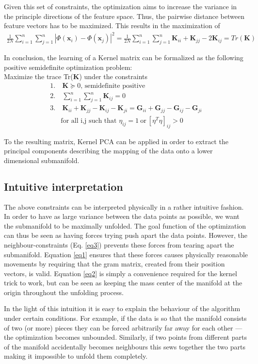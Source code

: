 \documentclass[a4paper,12pt]{article}
\newcommand{\mx}{\mathbf{x}}
\newcommand{\mG}{\mathbf{G}}
\newcommand{\mK}{\mathbf{K}}
\newcommand{\K}{\textbf{K}}
\begin{document}
Given this set of constraints, the optimization aims to increase the variance in the principle directions of the feature space. Thus, the pairwise distance between feature vectors has to be maximized. This results in the maximization of 
\begin{align}
\frac{1}{2N}\sum_{i = 1}^n\sum_{j = 1}^n |\Phi(\mx_i) - \Phi(\mx_j)|^2 =  \frac{1}{2N}\sum_{i = 1}^n\sum_{j = 1}^n \mK_{ii} + \mK_{jj} - 2 \mK_{ij} = Tr(\mK)
\end{align}

In conclusion, the learning of a Kernel matrix can be formalized as the following positive semidefinite optimization problem:\\
Maximize the trace Tr(\K) under the constraints
\begin{align}
\label{eq1}1.& \ \mK\succeq 0 \text{, semidefinite positive}\\
\label{eq2}2.& \ \sum_{i = 1}^n\sum_{j = 1}^n \mK_{ij} = 0\\
\label{eq3}3.&  \ \mK_{ii} + \mK_{jj} - \mK_{ij} - \mK_{ji}  = \mG_{ii} + \mG_{jj} - \mG_{ij} - \mG_{ji}\\
& \text{for all i,j such that } \eta_{ij} = 1 \ \text{or}\ [\eta^T\eta]_{ij} > 0 \nonumber 
\end{align} 

To the resulting matrix, Kernel PCA can be applied in order to extract the principal components describing the mapping of the data onto a lower dimensional submanifold. 

\subsection{Intuitive interpretation}
The above constraints can be interpreted physically in a rather intuitive fashion. In order to have as large variance between the data points as possible, we want the submanifold to be maximally unfolded. The goal function of the optimization can thus be seen as having forces trying push apart the data points. However, the neighbour-constraints (Eq. \ref{eq3}) prevents these forces from tearing apart the submanifold. Equation \ref{eq1} ensures that these forces causes physically reasonable movements by requiring that the gram matrix, created from their position vectors, is valid. Equation \ref{eq2} is simply a convenience required for the kernel trick to work, but can be seen as keeping the mass center of the manifold at the origin throughout the unfolding process.

In the light of this intuition it is easy to explain the behaviour of the algorithm under certain conditions. For example, if the data is so that the manifold consists of two (or more) pieces they can be forced arbitrarily far away for each other --- the optimization becomes unbounded. Similarly, if two points from different parts of the manifold accidentally becomes neighbours this sews together the two parts making it impossible to unfold them completely.
\end{document}

